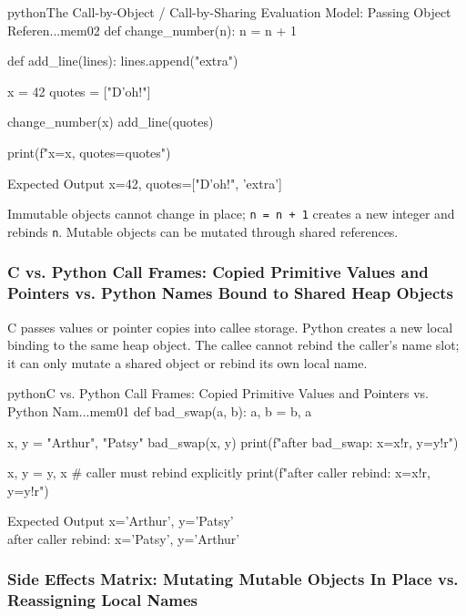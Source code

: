 \documentclass[a4paper,twoside]{report}
\begin{document}
\begin{codebox}[]{python}{The Call-by-Object / Call-by-Sharing Evaluation Model: Passing Object Referen...}{mem02}
def change_number(n):
    n = n + 1

def add_line(lines):
    lines.append("extra")

x = 42
quotes = ["D'oh!"]

change_number(x)
add_line(quotes)

print(f"x={x}, quotes={quotes}")
\end{codebox}


\begin{iobox}{Expected Output}
x=42, quotes=["D'oh!", 'extra'] \\
\end{iobox}




Immutable objects cannot change in place; \texttt{n = n + 1} creates a new integer and rebinds \texttt{n}. Mutable objects can be mutated through shared references.

\subsubsection{C vs. Python Call Frames: Copied Primitive Values and Pointers vs. Python Names Bound to Shared Heap Objects}

C passes values or pointer copies into callee storage. Python creates a new local binding to the same heap object. The callee cannot rebind the caller's name slot; it can only mutate a shared object or rebind its own local name.

\begin{codebox}[]{python}{C vs. Python Call Frames: Copied Primitive Values and Pointers vs. Python Nam...}{mem01}
def bad_swap(a, b):
    a, b = b, a

x, y = "Arthur", "Patsy"
bad_swap(x, y)
print(f"after bad_swap: x={x!r}, y={y!r}")

x, y = y, x  # caller must rebind explicitly
print(f"after caller rebind: x={x!r}, y={y!r}")
\end{codebox}


\begin{iobox}{Expected Output}
x='Arthur', y='Patsy' \\
after caller rebind: x='Patsy', y='Arthur' \\
\end{iobox}




\subsubsection{Side Effects Matrix: Mutating Mutable Objects In Place vs. Reassigning Local Names}
\end{document}
